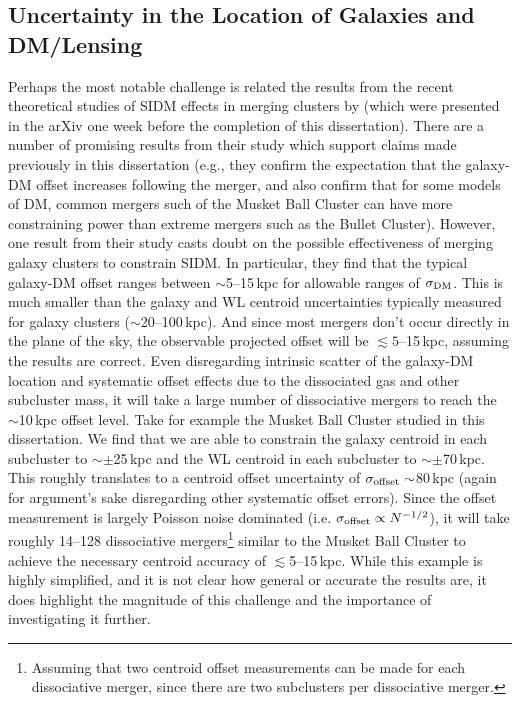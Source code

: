 \subsection{Uncertainty in the Location of Galaxies and DM/Lensing}

Perhaps the most notable challenge is related the results from the recent theoretical studies of SIDM effects in merging clusters by \citet{Kahlhoefer:2013wp} (which were presented in the arXiv one week before the completion of this dissertation).
There are a number of promising results from their study which support claims made previously in this dissertation (e.g., they confirm the expectation that the galaxy-DM offset increases following the merger, and also confirm that for some models of DM, common mergers such of the Musket Ball Cluster can have more constraining power than extreme mergers such as the Bullet Cluster).
However, one result from their study casts doubt on the possible effectiveness of merging galaxy clusters to constrain SIDM.
In particular, they find that the typical galaxy-DM offset ranges between $\sim$5--15\,kpc for allowable ranges of $\sigma_{\rm DM}$.
This is much smaller than the galaxy and WL centroid uncertainties typically measured for galaxy clusters ($\sim$20--100\,kpc).
And since most mergers don't occur directly in the plane of the sky, the observable projected offset will be $\lesssim5$--15\,kpc, assuming the \citet{Kahlhoefer:2013wp} results are correct.
Even disregarding intrinsic scatter of the galaxy-DM location and systematic offset effects due to the dissociated gas and other subcluster mass, it will take a large number of dissociative mergers to reach the $\sim$10\,kpc offset level.
Take for example the Musket Ball Cluster studied in this dissertation.
We find that we are able to constrain the galaxy centroid in each subcluster to $\sim\pm$25\,kpc and the WL centroid in each subcluster to $\sim\pm$70\,kpc.
This roughly translates to a centroid offset uncertainty of $\sigma_{\rm offset}\sim$80\,kpc (again for argument's sake disregarding other systematic offset errors).
Since the offset measurement is largely Poisson noise dominated (i.e. $\sigma_{\rm offset}\propto N^{-1/2}$), it will take roughly 14--128 dissociative mergers\footnote{Assuming that two centroid offset measurements can be made for each dissociative merger, since there are two subclusters per dissociative merger.} similar to the Musket Ball Cluster to achieve the necessary centroid accuracy of $\lesssim$5--15\,kpc.
While this example is highly simplified, and it is not clear how general or accurate the \citet{Kahlhoefer:2013wp} results are,  it does highlight the magnitude of this challenge and the importance of investigating it further.

